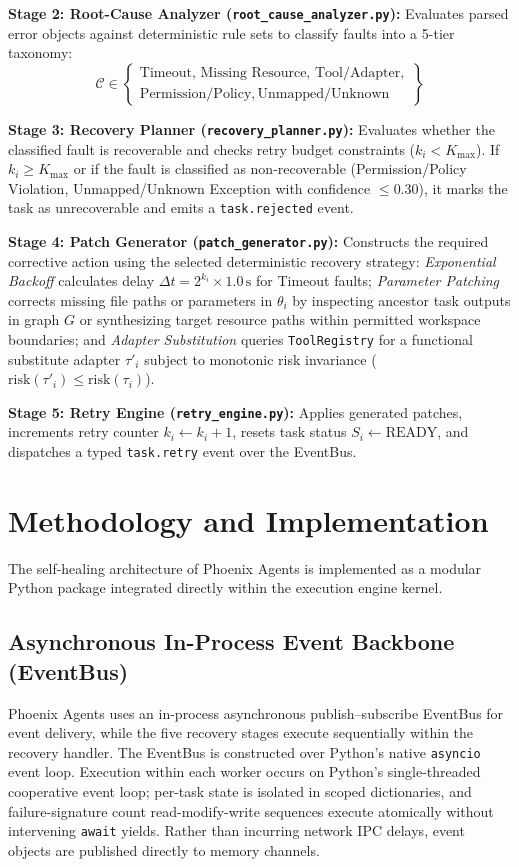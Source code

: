 \documentclass[conference]{IEEEtran}
\newcommand{\chg}[1]{{\color{blue}#1}}
\begin{document}
\textbf{Stage 2: Root-Cause Analyzer (\texttt{root\_cause\_analyzer.py}):} Evaluates parsed error objects against deterministic rule sets to classify faults into a 5-tier taxonomy:
\begin{equation}
\mathcal{C} \in \left\{
\begin{array}{l}
\text{Timeout}, \, \text{Missing Resource}, \, \text{Tool/Adapter}, \\
\text{Permission/Policy}, \, \text{Unmapped/Unknown}
\end{array}
\right\}
\end{equation}

\textbf{Stage 3: Recovery Planner (\texttt{recovery\_planner.py}):} Evaluates whether the classified fault is recoverable and checks retry budget constraints ($k_i < K_{\text{max}}$). If $k_i \ge K_{\text{max}}$ or if the fault is classified as non-recoverable (Permission/Policy Violation, Unmapped/Unknown Exception with confidence $\le 0.30$), it marks the task as unrecoverable and emits a \texttt{task.rejected} event.

\textbf{Stage 4: Patch Generator (\texttt{patch\_generator.py}):} Constructs the required corrective action using the selected deterministic recovery strategy: \textit{Exponential Backoff} calculates delay $\Delta t = 2^{k_i} \times 1.0\,\text{s}$ for Timeout faults; \textit{Parameter Patching} corrects missing file paths or parameters in $\theta_i$ by inspecting ancestor task outputs in graph $G$ or synthesizing target resource paths within permitted workspace boundaries; and \textit{Adapter Substitution} queries \texttt{ToolRegistry} for a functional substitute adapter $\tau'_i$ \chg{subject to monotonic risk invariance ($\text{risk}(\tau'_i) \le \text{risk}(\tau_i)$)}.

\textbf{Stage 5: Retry Engine (\texttt{retry\_engine.py}):} Applies generated patches, increments retry counter $k_i \leftarrow k_i + 1$, resets task status $S_i \leftarrow \text{READY}$, and dispatches a typed \texttt{task.retry} event over the EventBus.

\section{Methodology and Implementation}
The self-healing architecture of Phoenix Agents is implemented as a modular Python package integrated directly within the execution engine kernel.

\subsection{Asynchronous In-Process Event Backbone (EventBus)}
Phoenix Agents uses an in-process asynchronous publish--subscribe EventBus for event delivery, while the five recovery stages execute sequentially within the recovery handler. The EventBus is constructed over Python's native \texttt{asyncio} event loop. \chg{Execution within each worker occurs on Python's single-threaded cooperative event loop; per-task state is isolated in scoped dictionaries, and failure-signature count read-modify-write sequences execute atomically without intervening \texttt{await} yields.} Rather than incurring network IPC delays, event objects are published directly to memory channels.
\end{document}

